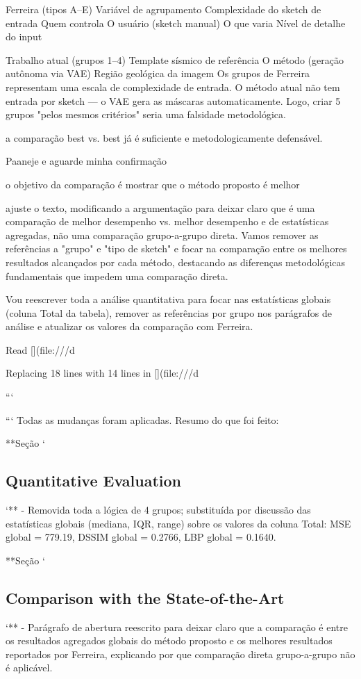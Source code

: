 Ferreira (tipos A–E)	
    Variável de agrupamento	Complexidade do sketch de entrada
    Quem controla	O usuário (sketch manual)
    O que varia	Nível de detalhe do input

Trabalho atual (grupos 1–4)
	Template sísmico de referência
    O método (geração autônoma via VAE)
	Região geológica da imagem
Os grupos de Ferreira representam uma escala de complexidade de entrada. O método atual não tem entrada por sketch — o VAE gera as máscaras automaticamente. Logo, criar 5 grupos "pelos mesmos critérios" seria uma falsidade metodológica.

a comparação best vs. best já é suficiente e metodologicamente defensável. 

Paaneje e aguarde minha confirmação

o objetivo da comparação é mostrar que o método proposto é melhor

 ajuste o texto, modificando a argumentação para deixar claro que é uma comparação de melhor desempenho vs. melhor desempenho e de estatísticas agregadas, não uma comparação grupo-a-grupo direta. Vamos remover as referências a "grupo" e "tipo de sketch" e focar na comparação entre os melhores resultados alcançados por cada método, destacando as diferenças metodológicas fundamentais que impedem uma comparação direta.




Vou reescrever toda a análise quantitativa para focar nas estatísticas globais (coluna Total da tabela), remover as referências por grupo nos parágrafos de análise e atualizar os valores da comparação com Ferreira. 

Read [](file:///d%

Replacing 18 lines with 14 lines in [](file:///d%


```

```
Todas as mudanças foram aplicadas. Resumo do que foi feito:

**Seção `\subsection{Quantitative Evaluation}`**
- Removida toda a lógica de 4 grupos; substituída por discussão das estatísticas globais (mediana, IQR, range) sobre os valores da coluna Total: MSE global = 779.19, DSSIM global = 0.2766, LBP global = 0.1640.

**Seção `\subsection{Comparison with the State-of-the-Art}`**
- Parágrafo de abertura reescrito para deixar claro que a comparação é entre os resultados agregados globais do método proposto e os melhores resultados reportados por Ferreira, explicando por que comparação direta grupo-a-grupo não é aplicável.

